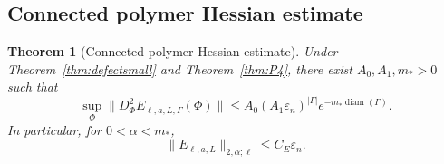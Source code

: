 \documentclass[12pt]{article}
\theoremstyle{plain}
\newtheorem{theorem}{Theorem}[section]
\theoremstyle{definition}
\numberwithin{equation}{section}
\newcommand{\diam}{\operatorname{diam}}
\begin{document}
\subsection{Connected polymer Hessian estimate}

\begin{theorem}[Connected polymer Hessian estimate]\label{thm:polymerHessian}
Under Theorem~\ref{thm:defectsmall} and Theorem~\ref{thm:P4}, there exist $A_0,A_1,m_*>0$ such that
\begin{equation}
\sup_\Phi\|D_\Phi^2 E_{\ell,a,L,\Gamma}(\Phi)\| \leq A_0(A_1\varepsilon_n)^{|\Gamma|}e^{-m_*\diam(\Gamma)}.
\end{equation}
In particular, for $0<\alpha<m_*$,
\begin{equation}
\boxed{\|E_{\ell,a,L}\|_{2,\alpha;\ell} \leq C_E\varepsilon_n.}
\end{equation}
\end{theorem}
\end{document}

